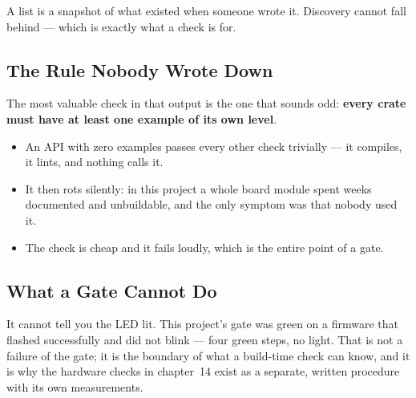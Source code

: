 A list is a snapshot of what existed when someone wrote it. Discovery cannot fall behind — which is
exactly what a check is for.

\subsection{The Rule Nobody Wrote Down}

The most valuable check in that output is the one that sounds odd: \textbf{every crate must have at
least one example of its own level}.

\begin{itemize}
    \item An API with zero examples passes every other check trivially — it compiles, it lints, and
          nothing calls it.
    \item It then rots silently: in this project a whole board module spent weeks documented and
          unbuildable, and the only symptom was that nobody used it.
    \item The check is cheap and it fails loudly, which is the entire point of a gate.
\end{itemize}

\subsection{What a Gate Cannot Do}

It cannot tell you the LED lit. This project's gate was green on a firmware that flashed successfully
and did not blink — four green steps, no light. That is not a failure of the gate; it is the boundary
of what a build-time check can know, and it is why the hardware checks in chapter~14 exist as a
separate, written procedure with its own measurements.
